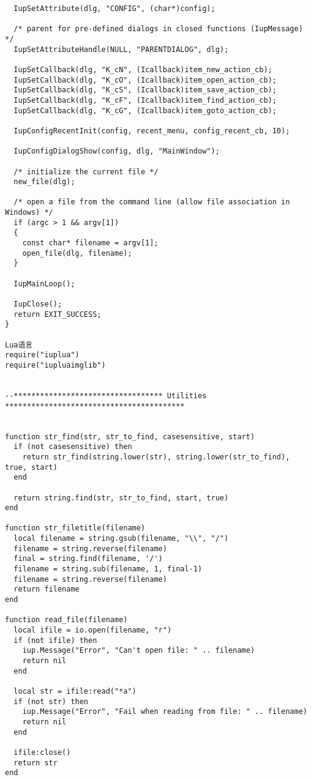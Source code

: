 \documentclass{ctexart}
\begin{document}
\begin{lstlisting}
  IupSetAttribute(dlg, "CONFIG", (char*)config);

  /* parent for pre-defined dialogs in closed functions (IupMessage) */
  IupSetAttributeHandle(NULL, "PARENTDIALOG", dlg);

  IupSetCallback(dlg, "K_cN", (Icallback)item_new_action_cb);
  IupSetCallback(dlg, "K_cO", (Icallback)item_open_action_cb);
  IupSetCallback(dlg, "K_cS", (Icallback)item_save_action_cb);
  IupSetCallback(dlg, "K_cF", (Icallback)item_find_action_cb);
  IupSetCallback(dlg, "K_cG", (Icallback)item_goto_action_cb);
  
  IupConfigRecentInit(config, recent_menu, config_recent_cb, 10);

  IupConfigDialogShow(config, dlg, "MainWindow");

  /* initialize the current file */
  new_file(dlg);

  /* open a file from the command line (allow file association in Windows) */
  if (argc > 1 && argv[1])
  {
    const char* filename = argv[1];
    open_file(dlg, filename);
  }

  IupMainLoop();

  IupClose();
  return EXIT_SUCCESS;
}

Lua语言
require("iuplua")
require("iupluaimglib")


--********************************** Utilities *****************************************


function str_find(str, str_to_find, casesensitive, start)
  if (not casesensitive) then
    return str_find(string.lower(str), string.lower(str_to_find), true, start)
  end

  return string.find(str, str_to_find, start, true)
end

function str_filetitle(filename)
  local filename = string.gsub(filename, "\\", "/")
  filename = string.reverse(filename)
  final = string.find(filename, '/')
  filename = string.sub(filename, 1, final-1)
  filename = string.reverse(filename)
  return filename
end

function read_file(filename)
  local ifile = io.open(filename, "r")
  if (not ifile) then
    iup.Message("Error", "Can't open file: " .. filename)
    return nil
  end
  
  local str = ifile:read("*a")
  if (not str) then
    iup.Message("Error", "Fail when reading from file: " .. filename)
    return nil
  end
  
  ifile:close()
  return str
end


\end{lstlisting}
\end{document}
